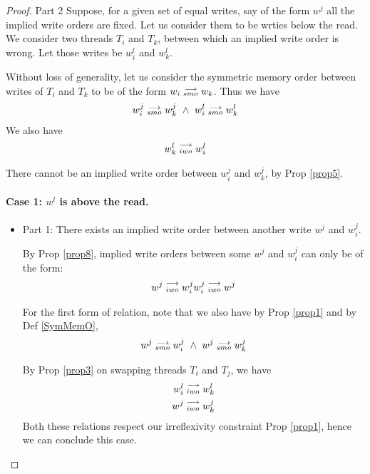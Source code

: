         \begin{proof}{Part 2}
            Suppose, for a given set of equal writes, say of the form $w^j$ all the implied write orders are fixed. Let us consider them to be wrties below the read. We consider two threads $T_i$ and $T_k$, between which an implied write order is wrong. Let those writes be $w_i^l$ and $w_k^l$. 

            Without loss of generality, let us consider the symmetric memory order between writes of $T_i$ and $T_k$ to be of the form $w_i\stackrel{\longrightarrow}{_{smo}}w_k$. Thus we have 
            \begin{align*}
                \reln{w_i^j}{smo}{w_k^j} \ \wedge \ \reln{w_i^l}{smo}{w_k^l}
            \end{align*}
            We also have 
            \begin{align*}
                w_k^l\stackrel{\longrightarrow}{_{iwo}}w_i^l
            \end{align*}

            There cannot be an implied write order between $w_i^j$ and $w_k^j$, by Prop \ref{prop5}. 

            \paragraph{Case 1: $w^l$ is above the read.}

                \begin{itemize}
                    \item Part 1: There exists an implied write order between another write $w^j$ and $w_i^j$.

                        By Prop \ref{prop8}, implied write orders between some $w^j$ and $w_i^j$ can only be of the form:
                        \begin{align*}
                            w^j\stackrel{\longrightarrow}{_{iwo}}w_i^j
                            w_i^j\stackrel{\longrightarrow}{_{iwo}}w^j
                        \end{align*}

                        For the first form of relation, note that we also have by Prop \ref{prop1} and by Def \ref{SymMemO}, 
                        \begin{align*}
                            \reln{w^j}{smo}{w_i^j} \ \wedge \ \reln{w^j}{smo}{w_k^j}
                        \end{align*}

                        By Prop \ref{prop3} on swapping threads $T_i$ and $T_j$, we have 
                        \begin{align*}
                            w_i^l\stackrel{\longrightarrow}{_{iwo}}w_k^l \\ 
                            w^j\stackrel{\longrightarrow}{_{iwo}}w_k^j
                        \end{align*}
                        Both these relations respect our irreflexivity constraint Prop \ref{prop1}, hence we can conclude this case. 


\end{itemize}
\end{proof}
